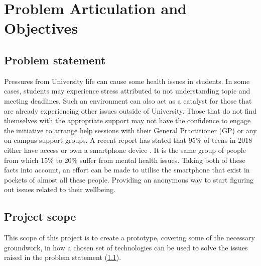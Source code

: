 \section{Problem Articulation and Objectives}

\subsection{Problem statement} \label{problemstatement}

Pressures from University life can cause some health issues in students.
In some cases, students may experience stress attributed to not understanding topic and meeting deadlines.
Such an environment can also act as a catalyst for those that are already experiencing other issues outside of University.
Those that do not find themselves with the appropriate support may not have the confidence to engage the initiative to arrange help sessions with their General Practitioner (GP) or any on-campus support groups. 
A recent report has stated that 95\% of teens in 2018 either have access or own a smartphone device \cite{monicajing2018teenstechnology}.
It is the same group of people from which 15\% to 20\% suffer from mental health issues.
Taking both of these facts into account, an effort can be made to utilise the smartphone that exist in pockets of almost all these people. Providing an anonymous way to start figuring out issues related to their wellbeing.


\subsection{Project scope}
This scope of this project is to create a prototype, covering some of the necessary groundwork, in how a chosen set of technologies can be used 
to solve the issues raised in the problem statement (\ref{problemstatement}).

